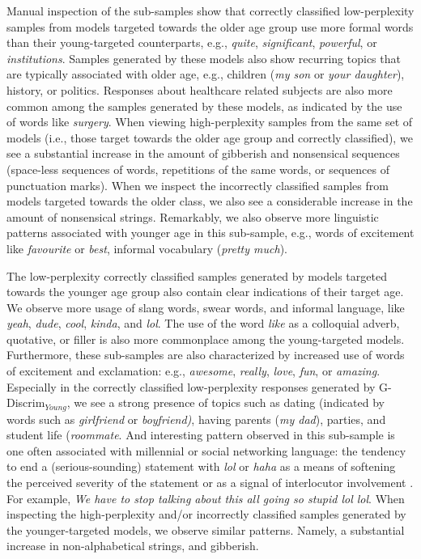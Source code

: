 Manual inspection of the sub-samples show that correctly classified low-perplexity samples from models targeted towards the older age group use more formal words than their young-targeted counterparts, e.g., \textit{quite}, \textit{significant}, \textit{powerful}, or \textit{institutions}. Samples generated by these models also show recurring topics that are typically associated with older age, e.g., children (\textit{my son} or \textit{your daughter}), history, or politics. Responses about healthcare related subjects are also more common among the samples generated by these models, as indicated by the use of words like \textit{surgery}. When viewing high-perplexity samples from the same set of models (i.e., those target towards the older age group and correctly classified), we see a substantial increase in the amount of gibberish and nonsensical sequences (space-less sequences of words, repetitions of the same words, or sequences of punctuation marks). When we inspect the incorrectly classified samples from models targeted towards the older class, we also see a considerable increase in the amount of nonsensical strings. Remarkably, we also observe more linguistic patterns associated with younger age in this sub-sample, e.g., words of excitement like \textit{favourite} or \textit{best}, informal vocabulary (\textit{pretty much}).

The low-perplexity correctly classified samples generated by models targeted towards the younger age group also contain clear indications of their target age. We observe more usage of slang words, swear words, and informal language, like \textit{yeah}, \textit{dude}, \textit{cool}, \textit{kinda}, and \textit{lol}. The use of the word \textit{like} as a colloquial adverb, quotative, or filler is also more commonplace among the young-targeted models.  Furthermore, these sub-samples are also characterized by increased use of words of excitement and exclamation: e.g., \textit{awesome}, \textit{really}, \textit{love}, \textit{fun}, or \textit{amazing}. Especially in the correctly classified low-perplexity responses generated by G-Discrim$_{Young}$, we see a strong presence of topics such as dating (indicated by words such as \textit{girlfriend} or \textit{boyfriend)}, having parents (\textit{my dad}), parties, and student life (\textit{roommate}. And interesting pattern observed in this sub-sample is one often associated with millennial or social networking language: the tendency to end a (serious-sounding) statement with \textit{lol} or \textit{haha} as a means of softening the perceived severity of the statement or as a signal of interlocutor involvement \citep{newitz2019you, tagliamonte2008linguistic}. For example, \textit{We have to stop talking about this all going so stupid lol lol}. When inspecting the high-perplexity and/or incorrectly classified samples generated by the younger-targeted models, we observe similar patterns. Namely, a substantial increase in non-alphabetical strings, and gibberish.

